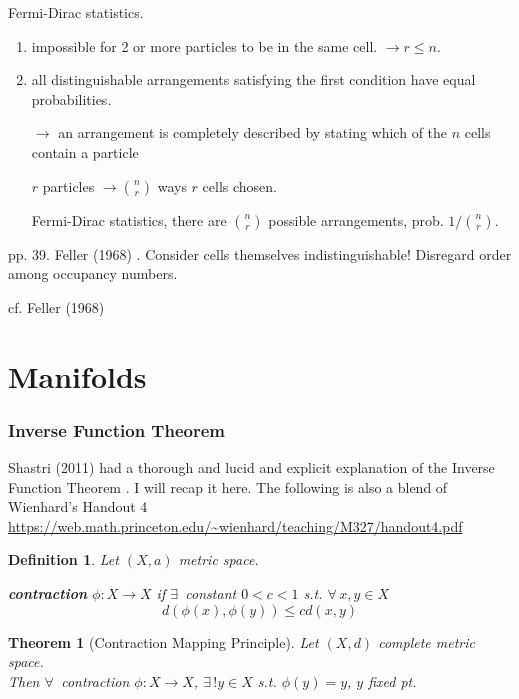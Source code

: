 \documentclass[10pt]{amsart}
\newtheorem{theorem}{Theorem}
\newtheorem{definition}{Definition}
\begin{document}
\begin{multicols*}{2}
\begin{enumerate}
Fermi-Dirac statistics.  
\begin{enumerate}
\item[(1)] impossible for 2 or more particles to be in the same cell.  $\to r \leq n$.  
\item[(2)] all distinguishable arrangements satisfying the first condition have equal probabilities.  

$\to$ an arrangement is completely described by stating which of the $n$ cells contain a particle  

$r$ particles $\to \binom{n}{r}$ ways $r$ cells chosen.  

Fermi-Dirac statistics, there are $\binom{n}{r}$ possible arrangements, prob. $1/\binom{n}{r}$.  
\end{enumerate}
\end{enumerate}
pp. 39.  Feller (1968)  \cite{Fell1968}.  Consider cells themselves indistinguishable!  Disregard order among occupancy numbers.  








cf. Feller (1968)  \cite{Fell1968}






\part{Manifolds}


\section{Inverse Function Theorem}

Shastri (2011) had a thorough and lucid and explicit explanation of the Inverse Function Theorem \cite{AShastri2011}.  I will recap it here.  The following is also a blend of Wienhard's Handout 4 \url{https://web.math.princeton.edu/~wienhard/teaching/M327/handout4.pdf}

\begin{definition}
  Let $(X,a)$ metric space.  

\textbf{contraction} $\phi:X \to X$ if $\exists \, $ constant $0<c<1$ s.t. $\forall \, x,y \in X$
\[
d(\phi(x),\phi(y)) \leq cd(x,y)
\]
\end{definition}

\begin{theorem}[Contraction Mapping Principle]
  Let $(X,d)$ complete metric space.  \\
Then $\forall \, $ contraction $\phi:X\to X$, $\exists \, ! y\in X$ s.t. $\phi(y) = y$, $y$ \emph{fixed pt.}
\end{theorem}


\end{multicols*}
\end{document}
